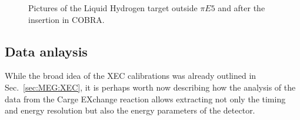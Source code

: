\begin{refsection}
        \begin{figure}
            \centering
            \caption[CEX: Installation of the target]{Pictures of the Liquid Hydrogen target outside $\pi E5$ and after the insertion in COBRA.}
            \label{fig:CEX:2021:installation}
        \end{figure}

    \subsection{Data anlaysis}
        While the broad idea of the XEC calibrations was already outlined in Sec.~\ref{sec:MEG:XEC}, it is perhaps worth now describing how the analysis of the data from the Carge EXchange reaction allows extracting not only the timing and energy resolution but also the energy parameters of the detector.
        

\end{refsection}
